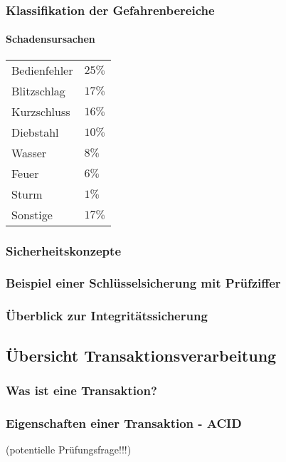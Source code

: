 \subsubsection{Klassifikation der Gefahrenbereiche}
\paragraph{Schadensursachen} \parskp
\begin{tabular}{l l}
Bedienfehler & $25\%$\\
Blitzschlag & $17\%$\\
Kurzschluss & $16\%$\\
Diebstahl & $10\%$\\
Wasser & $8\%$\\
Feuer & $6\%$\\
Sturm & $1\%$\\
Sonstige & $17\%$
\end{tabular}
\subsubsection{Sicherheitskonzepte}
\subsubsection*{Beispiel einer Schlüsselsicherung mit Prüfziffer}
\subsubsection{Überblick zur Integritätssicherung}
\subsection{Übersicht Transaktionsverarbeitung}
\subsubsection*{Was ist eine Transaktion?}
\subsubsection{Eigenschaften einer Transaktion - ACID}
(potentielle Prüfungsfrage!!!)

